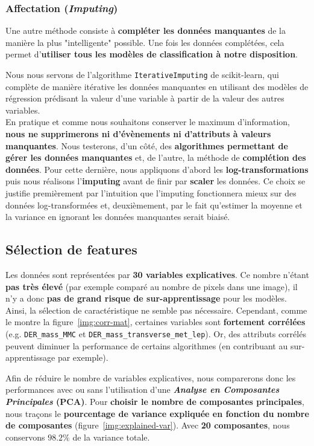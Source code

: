 \documentclass[12pt]{article}
\newcommand{\figref}[1]{figure~\ref{#1}}
\begin{document}
\subsubsection{Affectation (\emph{Imputing})}

Une autre méthode consiste à \textbf{compléter les données manquantes} de la
manière la plus "intelligente" possible. Une fois les données complétées, cela
permet d’\textbf{utiliser tous les modèles de classification à notre
disposition}. 

Nous nous servons de l’algorithme \texttt{IterativeImputing} de
scikit-learn, qui complète de manière itérative les données manquantes en
utilisant des modèles de régression prédisant la valeur d’une variable à partir
de la valeur des autres variables. \\

En pratique et comme nous souhaitons conserver le maximum d'information,
\textbf{nous ne supprimerons ni d'évènements ni d'attributs à valeurs
manquantes}. Nous testerons, d'un côté, des \textbf{algorithmes permettant de
gérer les données manquantes} et, de l'autre, la méthode de \textbf{complétion
des données}. Pour cette dernière, nous appliquons d'abord les
\textbf{log-transformations} puis nous réalisons l’\textbf{imputing} avant de
finir par \textbf{scaler} les données. Ce choix se justifie premièrement par
l’intuition que l’imputing fonctionnera mieux sur des données log-transformées
et, deuxièmement, par le fait qu’estimer la moyenne et la variance en ignorant
les données manquantes serait biaisé.

\subsection{Sélection de features}

Les données sont représentées par \textbf{30 variables explicatives}. Ce nombre
n’étant \textbf{pas très élevé} (par exemple comparé au nombre de pixels dans
une image), il n’y a donc \textbf{pas de grand risque de sur-apprentissage} pour
les modèles. Ainsi, la sélection de caractéristique ne semble pas nécessaire.
Cependant, comme le montre la \figref{img:corr-mat}, certaines variables sont
\textbf{fortement corrélées} (e.g. \texttt{DER\_mass\_MMC} et
\texttt{DER\_mass\_transverse\_met\_lep}). Or, des attributs corrélés peuvent
diminuer la performance de certains algorithmes (en contribuant au
sur-apprentissage par exemple).

Afin de réduire le nombre de variables explicatives, nous comparerons donc les
performances avec ou sans l’utilisation d’une \textbf{\emph{Analyse en
Composantes Principales} (PCA)}. Pour \textbf{choisir le nombre de composantes
principales}, nous traçons le \textbf{pourcentage de variance expliquée en
fonction du nombre de composantes} (\figref{img:explained-var}). Avec \textbf{20
composantes}, nous conservons $98.2\%$ de la variance totale.
\end{document}

